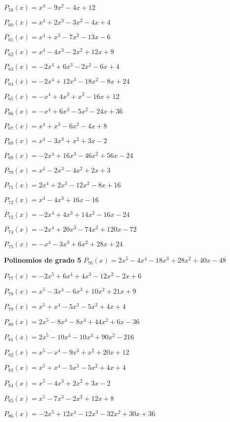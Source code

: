 \subitem $P_{59}(x) = x^4 - 9x^2 - 4x + 12$

\subitem $P_{60}(x) = x^4 + 2x^3 - 3x^2 - 4x + 4$

\subitem $P_{61}(x) = x^4 + x^3 - 7x^2 - 13x - 6$

\subitem $P_{62}(x) = x^4 - 4x^3 - 2x^2 + 12x + 9$

\subitem $P_{63}(x) = -2x^4 + 6x^3 - 2x^2 - 6x + 4$

\subitem $P_{64}(x) = -2x^4 + 12x^3 - 18x^2 - 8x + 24$

\subitem $P_{65}(x) = -x^4 + 4x^3 + x^2 - 16x + 12$

\subitem $P_{66}(x) = -x^4 + 6x^3 - 5x^2 - 24x + 36$

\subitem $P_{67}(x) = x^4 + x^3 - 6x^2 - 4x + 8$

\subitem $P_{68}(x) = x^4 - 3x^3 + x^2 + 3x - 2$

\subitem $P_{69}(x) = -2x^4 + 16x^3 - 46x^2 + 56x - 24$

\subitem $P_{70}(x) = x^4 - 2x^3 - 4x^2 + 2x + 3$

\subitem $P_{71}(x) = 2x^4 + 2x^3 - 12x^2 - 8x + 16$

\subitem $P_{72}(x) = x^4 - 4x^3 + 16x - 16$

\subitem $P_{73}(x) = -2x^4 + 4x^3 + 14x^2 - 16x - 24$

\subitem $P_{74}(x) = -2x^4 + 20x^3 - 74x^2 + 120x - 72$

\subitem $P_{75}(x) = -x^4 - 3x^3 + 6x^2 + 28x + 24$

\textbf{Polinomios de grado 5} 
\subitem $P_{76}(x) = 2x^5 - 4x^4 - 18x^3 + 28x^2 + 40x - 48$

\subitem $P_{77}(x) = -2x^5 + 6x^4 + 4x^3 - 12x^2 - 2x + 6$

\subitem $P_{78}(x) = x^5 - 3x^4 - 6x^3 + 10x^2 + 21x + 9$

\subitem $P_{79}(x) = x^5 + x^4 - 5x^3 - 5x^2 + 4x + 4$

\subitem $P_{80}(x) = 2x^5 - 8x^4 - 8x^3 + 44x^2 + 6x - 36$

\subitem $P_{81}(x) = 2x^5 - 10x^4 - 10x^3 + 90x^2 - 216$

\subitem $P_{82}(x) = x^5 - x^4 - 9x^3 + x^2 + 20x + 12$

\subitem $P_{83}(x) = x^5 + x^4 - 5x^3 - 5x^2 + 4x + 4$

\subitem $P_{84}(x) = x^5 - 4x^3 + 2x^2 + 3x - 2$

\subitem $P_{85}(x) = x^5 - 7x^3 - 2x^2 + 12x + 8$

\subitem $P_{86}(x) = -2x^5 + 12x^4 - 12x^3 - 32x^2 + 30x + 36$

